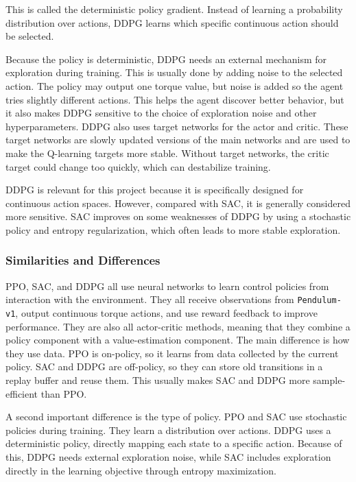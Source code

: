 \documentclass[11pt,a4paper]{article}
\begin{document}
This is called the deterministic policy gradient. Instead of learning a probability distribution over actions, DDPG learns which specific continuous action should be selected.

Because the policy is deterministic, DDPG needs an external mechanism for exploration during training. This is usually done by adding noise to the selected action. The policy may output one torque value, but noise is added so the agent tries slightly different actions. This helps the agent discover better behavior, but it also makes DDPG sensitive to the choice of exploration noise and other hyperparameters.
DDPG also uses target networks for the actor and critic. These target networks are slowly updated versions of the main networks and are used to make the Q-learning targets more stable. Without target networks, the critic target could change too quickly, which can destabilize training.

DDPG is relevant for this project because it is specifically designed for continuous action spaces. However, compared with SAC, it is generally considered more sensitive. SAC improves on some weaknesses of DDPG by using a stochastic policy and entropy regularization, which often leads to more stable exploration.

\subsubsection{Similarities and Differences}

PPO, SAC, and DDPG all use neural networks to learn control policies from interaction with the environment. They all receive observations from \texttt{Pendulum-v1}, output continuous torque actions, and use reward feedback to improve performance. They are also all actor-critic methods, meaning that they combine a policy component with a value-estimation component.
The main difference is how they use data. PPO is on-policy, so it learns from data collected by the current policy. SAC and DDPG are off-policy, so they can store old transitions in a replay buffer and reuse them. This usually makes SAC and DDPG more sample-efficient than PPO.

A second important difference is the type of policy. PPO and SAC use stochastic policies during training. They learn a distribution over actions. DDPG uses a deterministic policy, directly mapping each state to a specific action. Because of this, DDPG needs external exploration noise, while SAC includes exploration directly in the learning objective through entropy maximization.
\end{document}
